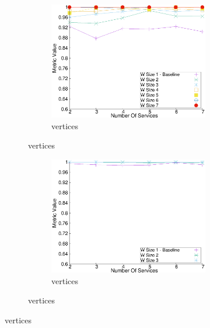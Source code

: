 \begin{figure}[H]
\begin{adjustbox}{minipage=\linewidth,scale=0.75}
\begin{subfigure}{0.45\textwidth}
      \begin{subfigure}{\textwidth}
        \includegraphics[width=\textwidth]{Images/graphs/window_quality_performance_diff_qual_n7_s7_20_100_n7}
        \caption{ vertices}
        \label{fig:quality_window_wide_qualitative_n7}
      \end{subfigure}
    \end{subfigure}
    \begin{subfigure}{0.45\textwidth}
      \begin{subfigure}{\textwidth}
        \includegraphics[width=\textwidth]{Images/graphs/window_quality_performance_diff_qual_n7_s7_50_80_n3}
        \caption{ vertices}
        \label{fig:quality_window_average_qualitative_n3}
      \end{subfigure}


\end{subfigure}
\end{adjustbox}
\end{figure}
